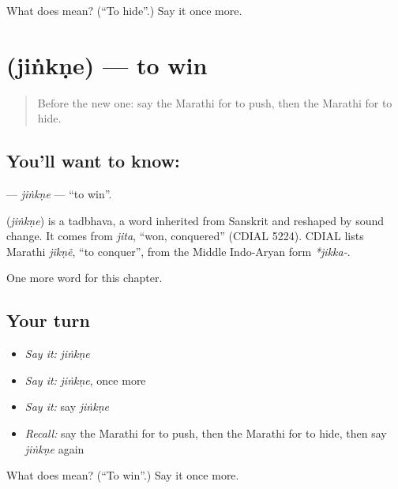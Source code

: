 \begin{tcolorbox}[breakable,colback=teal!4,colframe=teal!35!black,title={Before you move on}]
What does  mean? (\textquotedblleft{}To hide\textquotedblright{}.) Say it once more.
\end{tcolorbox}
\section[\texorpdfstring{\mr{जिंकणे} (jiṅkṇe)}{जिंकणे (jiṅkṇe)}]{ (jiṅkṇe) — to win}

\label{lesson:MR-C83-jinkne}



\begin{quote}
Before the new one: say the Marathi for to push, then the Marathi for to hide.
\end{quote}

\subsection*{You'll want to know: }
\textbf{} — \emph{jiṅkṇe} — \textquotedblleft{}to win\textquotedblright{}.

\begin{cousinweb}
\textbf{} (\emph{jiṅkṇe}) is a tadbhava, a word inherited from Sanskrit and reshaped by sound change. It comes from \emph{jita}, \textquotedblleft{}won, conquered\textquotedblright{} (CDIAL 5224). CDIAL lists Marathi \emph{jĩkṇẽ}, \textquotedblleft{}to conquer\textquotedblright{}, from the Middle Indo-Aryan form \emph{*jikka-}.
\end{cousinweb}

\begin{grammarlens}[title={What you've built}]
One more word for this chapter.
\end{grammarlens}

\subsection*{Your turn}
\begin{itemize}
\raggedright
  \item \emph{Say it:} \emph{jiṅkṇe}
  \item \emph{Say it:} \emph{jiṅkṇe}, once more
  \item \emph{Say it:} say \emph{jiṅkṇe}
  \item \emph{Recall:} say the Marathi for to push, then the Marathi for to hide, then say \emph{jiṅkṇe} again
\end{itemize}

\begin{tcolorbox}[breakable,colback=teal!4,colframe=teal!35!black,title={Before you move on}]
What does  mean? (\textquotedblleft{}To win\textquotedblright{}.) Say it once more.
\end{tcolorbox}
